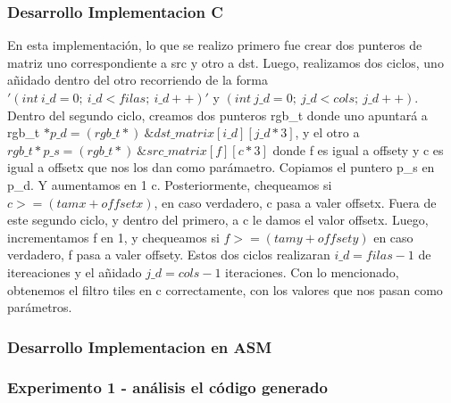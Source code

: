 \vspace*{0.3cm} \noindent
\subsubsection{Desarrollo Implementacion C}

En esta implementación, lo que se realizo primero fue crear dos punteros de matriz uno correspondiente a src y otro a dst.\newline
Luego, realizamos dos ciclos, uno añidado dentro del otro recorriendo de la forma $'(int\ i\_d = 0;\ i\_d < filas;\ i\_d++)'$ y 
$(int\ j\_d = 0;\ j\_d < cols;\ j\_d++)$.\newline
Dentro del segundo ciclo, creamos dos punteros rgb\_t donde uno apuntará a \newline rgb\_t $*p\_d = (rgb\_t*)\  \&dst\_matrix[i\_d][j\_d*3]$, y el otro
a $rgb\_t *p\_s = (rgb\_t*)\ \&src\_matrix[f][c*3]$ donde f es igual a offsety y c es igual a offsetx que nos los dan como parámaetro.\newline
Copiamos el puntero p\_s en p\_d. Y aumentamos en 1 c.\newline
Posteriormente, chequeamos si $c >= (tamx + offsetx)$, en caso verdadero, c pasa a valer offsetx.\newline
Fuera de este segundo ciclo, y dentro del primero, a c le damos el valor offsetx.\newline
Luego, incrementamos f en 1, y chequeamos si $f >= (tamy + offsety)$ en caso verdadero, f pasa a valer offsety.\newline
Estos dos ciclos realizaran $i\_d = filas -1$ de itereaciones y el añidado $j\_d = cols - 1$ iteraciones.\newline
Con lo mencionado, obtenemos el filtro tiles en c correctamente, con los valores que nos pasan como parámetros.\newline

\vspace*{0.3cm} \noindent
\subsubsection{Desarrollo Implementacion en ASM}



\vspace*{0.3cm} \noindent
\subsubsection{Experimento 1 - análisis el código generado}

